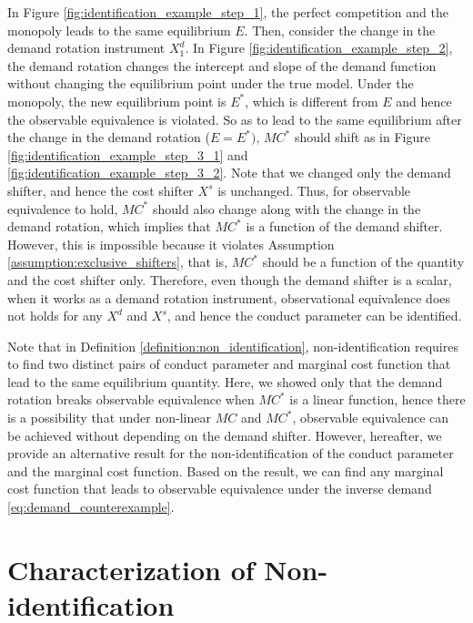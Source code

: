\documentclass[11pt, a4paper]{article}
\theoremstyle{remark}
\begin{document}
In Figure \ref{fig:identification_example_step_1}, the perfect competition and the monopoly leads to the same equilibrium $E$.
Then, consider the change in the demand rotation instrument $X^{d}_1$.
In Figure \ref{fig:identification_example_step_2}, the demand rotation changes the intercept and slope of the demand function without changing the equilibrium point under the true model.
Under the monopoly, the new equilibrium point is $E^{*}$, which is different from $E$ and hence the observable equivalence is violated.
So as to lead to the same equilibrium after the change in the demand rotation ($E = E^{*})$, $MC^{*}$ should shift as in Figure \ref{fig:identification_example_step_3_1} and \ref{fig:identification_example_step_3_2}.
Note that we changed only the demand shifter, and hence the cost shifter $X^{s}$ is unchanged.
Thus, for observable equivalence to hold, $MC^{*}$ should also change along with the change in the demand rotation, which implies that $MC^{*}$ is a function of the demand shifter.
However, this is impossible because it violates Assumption \ref{assumption:exclusive_shifters}, that is, $MC^{*}$ should be a function of the quantity and the cost shifter only.
Therefore, even though the demand shifter is a scalar, when it works as a demand rotation instrument, observational equivalence does not holds for any $X^{d}$ and $X^{s}$, and hence the conduct parameter can be identified.


Note that in Definition \ref{definition:non_identification}, non-identification requires to find two distinct pairs of conduct parameter and marginal cost function that lead to the same equilibrium quantity.
Here, we showed only that the demand rotation breaks observable equivalence when $MC^{*}$ is a linear function, hence there is a possibility that under non-linear $MC$ and $MC^{*}$, observable equivalence can be achieved without depending on the demand shifter.
However, hereafter, we provide an alternative result for the non-identification of the conduct parameter and the marginal cost function. Based on the result, we can find any marginal cost function that leads to observable equivalence under the inverse demand \eqref{eq:demand_counterexample}.




\section{Characterization of Non-identification}\label{sec:nonidentification_characterization}
\end{document}
